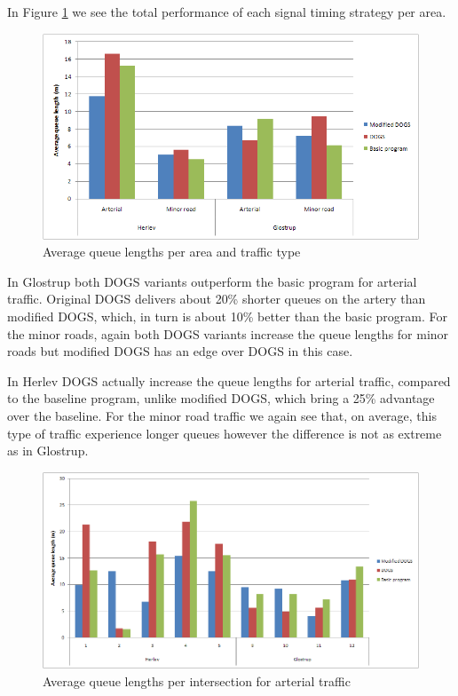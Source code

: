 In Figure \ref{fig:aveq_detail} we see the total performance of each signal timing strategy per area. 

\begin{figure}[ht]
\centering
\includegraphics[scale=0.40]{aveq_total_area_vs_traffic-type.png}
\caption{Average queue lengths per area and traffic type}
\label{fig:aveq_detail}
\end{figure}

In Glostrup both DOGS variants outperform the basic program for arterial traffic. Original DOGS delivers about 20\% shorter queues on the artery than modified DOGS, which, in turn is about 10\% better than the basic program. For the minor roads, again both DOGS variants increase the queue lengths for minor roads but modified DOGS has an edge over DOGS in this case.

In Herlev DOGS actually increase the queue lengths for arterial traffic, compared to the baseline program, unlike modified DOGS, which bring a 25\% advantage over the baseline. For the minor road traffic we again see that, on average, this type of traffic experience longer queues however the difference is not as extreme as in Glostrup.

\begin{figure}[ht]
\centering
\includegraphics[scale=0.30]{aveq_intersection_arterial.png}
\caption{Average queue lengths per intersection for arterial traffic}
\label{fig:aveq_int_art}
\end{figure}

